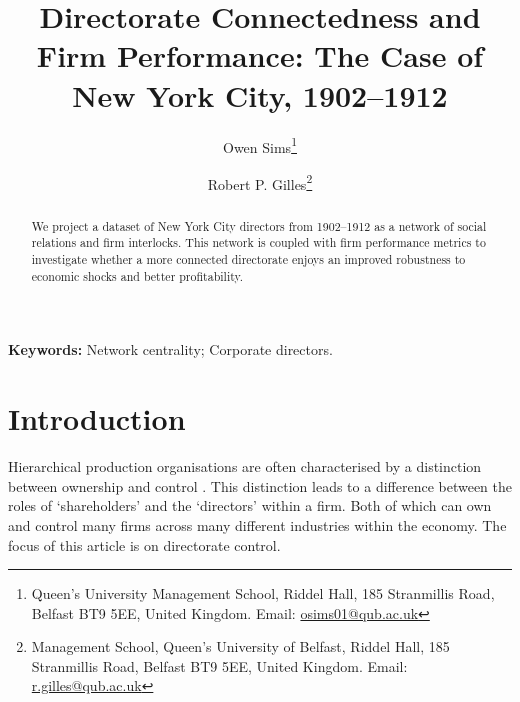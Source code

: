 \documentclass[11pt,fleqn]{article}
\begin{document}
\author{Owen Sims\thanks{Queen's University Management School, Riddel Hall, 185 Stranmillis Road, Belfast BT9 5EE, United Kingdom. \textsf{Email: \href{mailto:osims01@qub.ac.uk}{osims01@qub.ac.uk}}} \and Robert P. Gilles\thanks{Management School, Queen's University of Belfast, Riddel Hall, 185 Stranmillis Road, Belfast BT9 5EE, United Kingdom. \textsf{Email: \href{mailto:r.gilles@qub.ac.uk}{r.gilles@qub.ac.uk}}}}

\title{\textbf{Directorate Connectedness and Firm Performance: The Case of New York City, 1902--1912}}



\maketitle

\begin{singlespace}
	\begin{abstract}
		\noindent
		We project a dataset of New York City directors from 1902--1912 as a network of social relations and firm interlocks. This network is coupled with firm performance metrics to investigate whether a more connected directorate enjoys an improved robustness to economic shocks and better profitability.
	\end{abstract}
	
	\bigskip\noindent
	\textbf{Keywords:} Network centrality; Corporate directors.
	
\end{singlespace}

\thispagestyle{empty}

\newpage

\setcounter{page}{1} 

\section{Introduction}

Hierarchical production organisations are often characterised by a distinction between ownership and control \citep{JensenMeckling1976, FamaJensen1983}. This distinction leads to a difference between the roles of `shareholders' and the `directors' within a firm. Both of which can own and control many firms across many different industries within the economy. The focus of this article is on directorate control. 
\end{document}
